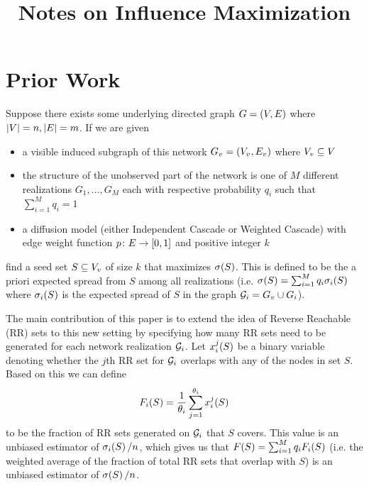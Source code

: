 \documentclass[11pt]{article}
\title{Notes on Influence Maximization}
\date{}
\newcommand{\infl}[1]{\ensuremath{\func{\sigma}{#1}}}
\begin{document}
\maketitle

\section{Prior Work}
\begin{problem}[PV-IM]
    Suppose there exists some underlying directed graph $G = \lrp{V, E}$ where $\abs{V} = n, \abs{E} = m$. If we are given
    \begin{itemize}[label=--]
        \itemsep0em 
        \item a visible induced subgraph of this network $G_v = \lrp{V_v, E_v}$ where $V_v \sse V$
        \item the structure of the unobserved part of the network is one of $M$ different realizations $G_1, \ldots, G_M$
        each with respective probability $q_i$ such that $\sum_{i=1}^{M} q_i = 1$ 
        \item a diffusion model (either Independent Cascade or Weighted Cascade) with edge weight function $p \colon E \rightarrow \lrb{0, 1}$ and positive integer $k$
    \end{itemize}  
    find a seed set $S \sse V_v$ of size $k$ that maximizes $\infl{S}$. This is defined to be the a priori expected spread from $S$ among all 
    realizations (i.e.\! $\infl{S} = \sum_{i=1}^{M} q_i \f[\sigma_i]{S}$ where $\f[\sigma_i]{S}$ is the expected spread of $S$ in the graph $\calG_i = G_v \cup G_i$). 
\end{problem}

The main contribution of this paper is to extend the idea of Reverse Reachable (RR) sets to this new setting by specifying 
how many RR sets need to be generated for each network realization $\calG_i$.
Let $\f[x_i^j]{S}$ be a binary variable 
denoting whether the $j$th RR set for $\calG_i$ overlaps with any of the nodes in set $S$. Based on this we can define 
\begin{equation*}
    \f[F_i]{S} = \frac{1}{\theta_i} \sum_{j=1}^{\theta_i} \f[x_i^j]{S}
\end{equation*}
to be the fraction of RR sets generated on $\calG_i$ that $S$ covers. This value is an unbiased estimator of $\f[\sigma_i]{S} / n$, which gives us that 
$\f[F]{S} = \sum_{i=1}^{M} q_i \f[F_i]{S}$ (i.e.\! the weighted average of the fraction of total RR sets that overlap with $S$) is an unbiased estimator of 
$\f[\sigma]{S} / n$. 
 
\end{document}
